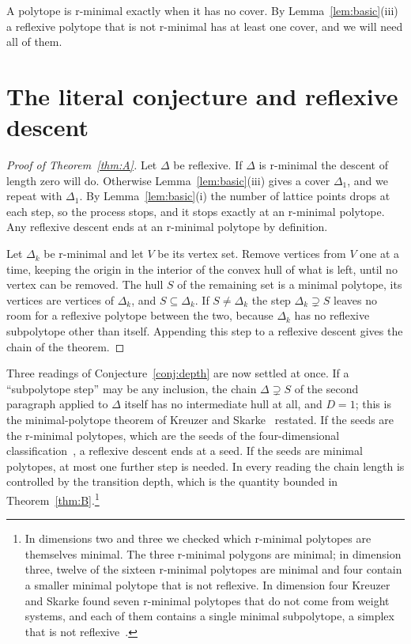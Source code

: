 \documentclass[manuscript]{aomart}
\theoremstyle{definition}
\theoremstyle{remark}
\begin{document}
A polytope is r-minimal exactly when it has no cover. By
Lemma~\ref{lem:basic}(iii) a reflexive polytope that is not r-minimal has
at least one cover, and we will need all of them.

\section{The literal conjecture and reflexive descent}\label{sec:literal}
\enlargethispage{4pt}

\begin{proof}[Proof of Theorem~\ref{thm:A}]
Let $\Delta$ be reflexive. If $\Delta$ is r-minimal the descent of length
zero will do. Otherwise Lemma~\ref{lem:basic}(iii) gives a cover
$\Delta_1$, and we repeat with $\Delta_1$. By Lemma~\ref{lem:basic}(i) the
number of lattice points drops at each step, so the process stops, and it
stops exactly at an r-minimal polytope. Any reflexive descent ends at an
r-minimal polytope by definition.

Let $\Delta_k$ be r-minimal and let $V$ be its vertex set. Remove vertices
from $V$ one at a time, keeping the origin in the interior of the convex
hull of what is left, until no vertex can be removed. The hull $S$ of the
remaining set is a minimal polytope, its vertices are vertices of
$\Delta_k$, and $S\subseteq\Delta_k$. If $S\ne\Delta_k$ the step
$\Delta_k\supsetneq S$ leaves no room for a reflexive polytope between the
two, because $\Delta_k$ has no reflexive subpolytope other than itself.
Appending this step to a reflexive descent gives the chain of the
theorem.
\end{proof}

Three readings of Conjecture~\ref{conj:depth} are now settled at once. If
a ``subpolytope step'' may be any inclusion, the chain
$\Delta\supsetneq S$ of the second paragraph applied to $\Delta$ itself
has no intermediate hull at all, and $D=1$; this is the minimal-polytope
theorem of Kreuzer and Skarke~\cite{KS97} restated. If the seeds are the
r-minimal polytopes, which are the seeds of the four-dimensional
classification~\cite{KS00}, a reflexive descent ends at a seed. If the
seeds are minimal polytopes, at most one further step is needed. In every
reading the chain length is controlled by the transition depth, which is
the quantity bounded in Theorem~\ref{thm:B}.\footnote{In dimensions two and
three we checked which r-minimal polytopes are themselves minimal. The
three r-minimal polygons are minimal; in dimension three, twelve of the
sixteen r-minimal polytopes are minimal and four contain a smaller
minimal polytope that is not reflexive. In dimension four Kreuzer and
Skarke found seven r-minimal polytopes that do not come from weight
systems, and each of them contains a single minimal subpolytope, a simplex
that is not reflexive~\cite{KS00}.}
\end{document}
